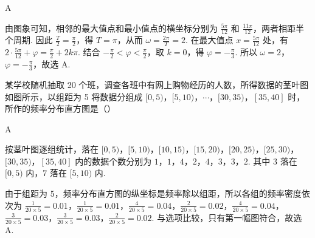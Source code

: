 \begin{answer}
A
\end{answer}

\begin{solution}
由图象可知，相邻的最大值点和最小值点的横坐标分别为 \(\frac{5\pi}{12}\) 和 \(\frac{11\pi}{12}\)，两者相距半个周期. 因此 \(\frac{T}{2}=\frac{\pi}{2}\)，得 \(T=\pi\)，从而 \(\omega=\frac{2\pi}{T}=2\). 在最大值点 \(x=\frac{5\pi}{12}\) 处，有
\(2\cdot\frac{5\pi}{12}+\varphi=\frac\pi2+2k\pi\). 结合 \(-\frac\pi2<\varphi<\frac\pi2\)，取 \(k=0\)，得 \(\varphi=-\frac\pi3\). 所以 \(\omega=2\)，\(\varphi=-\frac\pi3\)，故选 A.
\end{solution}

\begin{problem}
某学校随机抽取 20 个班，调查各班中有网上购物经历的人数，所得数据的茎叶图如图所示，以组距为 5 将数据分组成 \([0, 5)\)，\([5, 10)\)，\(\cdots\)，\([30, 35)\)，\([35, 40]\) 时，所作的频率分布直方图是（\quad）


    {}
    {}
    {}
\end{problem}

\begin{answer}
A
\end{answer}

\begin{solution}
按茎叶图逐组统计，落在 \([0,5)\)，\([5,10)\)，\([10,15)\)，\([15,20)\)，\([20,25)\)，\([25,30)\)，\([30,35)\)，\([35,40]\) 内的数据个数分别为 \(1\)，\(1\)，\(4\)，\(2\)，\(4\)，\(3\)，\(3\)，\(2\). 其中 \(3\) 落在 \([0,5)\) 内，\(7\) 落在 \([5,10)\) 内.

由于组距为 \(5\)，频率分布直方图的纵坐标是频率除以组距，所以各组的频率密度依次为
\(\frac{1}{20\times5}=0.01\)，\(\frac{1}{20\times5}=0.01\)，\(\frac{4}{20\times5}=0.04\)，\(\frac{2}{20\times5}=0.02\)，\(\frac{4}{20\times5}=0.04\)，\(\frac{3}{20\times5}=0.03\)，\(\frac{3}{20\times5}=0.03\)，\(\frac{2}{20\times5}=0.02\). 与选项比较，只有第一幅图符合，故选 A.
\end{solution}


